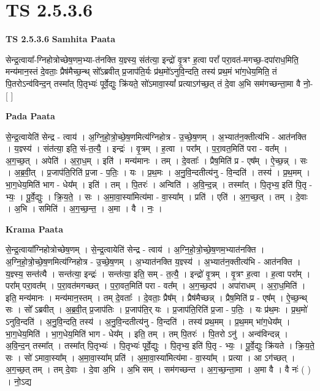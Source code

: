 \documentclass[17pt]{extarticle}
\begin{document}
\section*{ TS 2.5.3.6 }

\textbf{TS 2.5.3.6 } \newline
\textbf{Samhita Paata} \newline

सेन्द्र॒त्वाया᳚-ग्निहोत्रोच्छेष॒णम॒भ्या-त॑नक्ति य॒ज्ञ्स्य॒ संत॑त्या॒ इन्द्रो॑ वृ॒त्रꣳ ह॒त्वा परां᳚ परा॒वत॑-मगच्छ॒-दपा॑राध॒मिति॒ मन्य॑मान॒स्तं दे॒वताः॒ प्रैष॑मैच्छ॒न्थ् सो᳚ऽब्रवीत् प्र॒जाप॑ति॒र्यः प्र॑थ॒मो॑ऽनुवि॒न्दति॒ तस्य॑ प्रथ॒मं भा॑ग॒धेय॒मिति॒ तं पि॒तरोऽन्व॑विन्द॒न् तस्मा᳚त् पि॒तृभ्यः॑ पूर्वे॒द्युः क्रि॑यते॒ सो॑ऽमावा॒स्यां᳚ प्रत्याऽग॑च्छ॒त् तं दे॒वा अ॒भि सम॑गच्छन्ता॒मा वै नो॒-  [  ] \newline

\textbf{Pada Paata} \newline

से॒न्द्र॒त्वायेति॑ सेन्द्र - त्वाय॑ । अ॒ग्नि॒हो॒त्रो॒च्छे॒ष॒णमित्य॑ग्निहोत्र - उ॒च्छे॒ष॒णम् । अ॒भ्यात॑न॒क्तीत्य॑भि - आत॑नक्ति । य॒ज्ञ्स्य॑ । संत॑त्या॒ इति॒ सं-त॒त्यै॒ । इन्द्रः॑ । वृ॒त्रम् । ह॒त्वा । परा᳚म् । प॒रा॒वत॒मिति॑ परा - वत᳚म् । अ॒ग॒च्छ॒त् । अपेति॑ । अ॒रा॒ध॒म् । इति॑ । मन्य॑मानः । तम् । दे॒वताः᳚ । प्रैष॒मिति॑ प्र - एष᳚म् । ऐ॒च्छ॒न्न् । सः । अ॒ब्र॒वी॒त् । प्र॒जाप॑ति॒रिति॑ प्र॒जा - प॒तिः॒ । यः । प्र॒थ॒मः । अ॒नु॒वि॒न्दतीत्य॑नु - वि॒न्दति॑ । तस्य॑ । प्र॒थ॒मम् । भा॒ग॒धेय॒मिति॑ भाग - धेय᳚म् । इति॑ । तम् । पि॒तरः॑ । अन्विति॑ । अ॒वि॒न्द॒न्न् । तस्मा᳚त् । पि॒तृभ्य॒ इति॑ पि॒तृ - भ्यः॒ । पू॒र्वे॒द्युः । क्रि॒य॒ते॒ । सः । अ॒मा॒वा॒स्या॑मित्य॑मा - वा॒स्या᳚म् । प्रति॑ । एति॑ । अ॒ग॒च्छ॒त् । तम् । दे॒वाः । अ॒भि । समिति॑ । अ॒ग॒च्छ॒न्त॒ । अ॒मा । वै । नः॒ ।  \newline


\textbf{Krama Paata} \newline

से॒न्द्र॒त्वाया᳚ग्निहोत्रोच्छेष॒णम् । से॒न्द्र॒त्वायेति॑ सेन्द्र - त्वाय॑ । अ॒ग्नि॒हो॒त्रो॒च्छे॒ष॒णम॒भ्यात॑नक्ति । अ॒ग्नि॒हो॒त्रो॒च्छे॒ष॒णमित्य॑ग्निहोत्र - उ॒च्छे॒ष॒णम् । अ॒भ्यात॑नक्ति य॒ज्ञ्स्य॑ । अ॒भ्यात॑न॒क्तीत्य॑भि - आत॑नक्ति । य॒ज्ञ्स्य॒ सन्त॑त्यै । सन्त॑त्या॒ इन्द्रः॑ । सन्त॑त्या॒ इति॒ सम् - त॒त्यै॒ । इन्द्रो॑ वृ॒त्रम् । वृ॒त्रꣳ ह॒त्वा । ह॒त्वा परा᳚म् । परा᳚म् परा॒वत᳚म् । प॒रा॒वत॑मगच्छत् । प॒रा॒वत॒मिति॑ परा - वत᳚म् । अ॒ग॒च्छ॒दप॑ । अपा॑राधम् । अ॒रा॒ध॒मिति॑ । इति॒ मन्य॑मानः । मन्य॑मान॒स्तम् । तम् दे॒वताः᳚ । दे॒वताः॒ प्रैष᳚म् । प्रैष॑मैच्छन्न् । प्रैष॒मिति॑ प्र - एष᳚म् । ऐ॒च्छ॒न्थ् सः । सो᳚ ऽब्रवीत् । अ॒ब्र॒वी॒त् प्र॒जाप॑तिः । प्र॒जाप॑ति॒र् यः । प्र॒जाप॑ति॒रिति॑ प्र॒जा - प॒तिः॒ । यः प्र॑थ॒मः । प्र॒थ॒मो॑ ऽनुवि॒न्दति॑ । अ॒नु॒वि॒न्दति॒ तस्य॑ । अ॒नु॒वि॒न्दतीत्य॑नु - वि॒न्दति॑ । तस्य॑ प्रथ॒मम् । प्र॒थ॒मम् भा॑ग॒धेय᳚म् । भा॒ग॒धेय॒मिति॑ । भा॒ग॒धेय॒मिति॑ भाग - धेय᳚म् । इति॒ तम् । तम् पि॒तरः॑ । पि॒तरो ऽनु॑ । अन्व॑विन्दन्न् । अ॒वि॒न्द॒न् तस्मा᳚त् । तस्मा᳚त् पि॒तृभ्यः॑ । पि॒तृभ्यः॑ पूर्वे॒द्युः । पि॒तृभ्य॒ इति॑ पि॒तृ - भ्यः॒ । पू॒र्वे॒द्युः क्रि॑यते । क्रि॒य॒ते॒ सः । सो॑ ऽमावा॒स्या᳚म् । अ॒मा॒वा॒स्या᳚म् प्रति॑ । अ॒मा॒वा॒स्या॑मित्य॑मा - वा॒स्या᳚म् । प्रत्या । आ ऽग॑च्छत् । अ॒ग॒च्छ॒त् तम् । तम् दे॒वाः । दे॒वा अ॒भि । अ॒भि सम् । सम॑गच्छन्त । अ॒ग॒च्छ॒न्ता॒मा । अ॒मा वै । वै नः॑ ( ) । नो॒ऽद्य \newline
\end{document}
